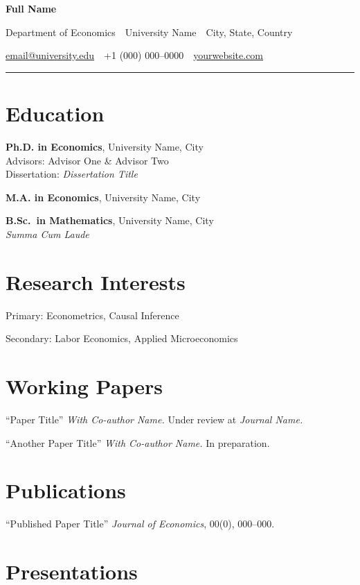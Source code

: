 \documentclass[11pt]{article}
\makeatletter
\newcommand{\cvname}{Full Name}
\newcommand{\cvdepartment}{Department of Economics}
\newcommand{\cvinstitution}{University Name}
\newcommand{\cvaddress}{City, State, Country}
\newcommand{\cvemail}{email@university.edu}
\newcommand{\cvphone}{+1 (000) 000--0000}
\newcommand{\cvwebsite}{yourwebsite.com}
\newlength{\cvdatecol}
\newenvironment{cventries}{%
    \begin{list}{}{%
            \setlength{\leftmargin}{\cvdatecol}%
            \setlength{\labelwidth}{\dimexpr\cvdatecol-0.5em\relax}%
            \setlength{\labelsep}{0.5em}%
            \setlength{\topsep}{2pt}%
            \setlength{\itemsep}{5pt}%
            \setlength{\parsep}{0pt}%
        }%
    }{
\end{list}}
\newcommand{\cventry}[2]{%
\item[\hfill\small\textit{#1}] #2%
}
\newcommand{\makecvheader}{%
    \thispagestyle{firstpage}%
    \begin{center}
        {\LARGE\textbf{\cvname}}\par
        \vspace{5pt}
        {\small\cvdepartment\ \textbullet\ \cvinstitution\ \textbullet\ \cvaddress}\par
        \vspace{3pt}
        {\small\href{mailto:\cvemail}{\cvemail}\ \textbullet\ \cvphone\ \textbullet\ \href{https://\cvwebsite}{\cvwebsite}}\par
    \end{center}
    \vspace{2pt}%
    \rule{\linewidth}{0.6pt}%
    \vspace{2pt}%
}
\makeatother
\begin{document}
\makecvheader{}

\section{Education}

\begin{cventries}
    \cventry{2020--present}{%
        \textbf{Ph.D. in Economics}, University Name, City\\
        Advisors: Advisor One \& Advisor Two\\
        Dissertation: \textit{Dissertation Title}
    }
    \cventry{2018}{%
        \textbf{M.A. in Economics}, University Name, City
    }
    \cventry{2016}{%
        \textbf{B.Sc.\ in Mathematics}, University Name, City\\
        \textit{Summa Cum Laude}
    }
\end{cventries}

\section{Research Interests}

Primary: Econometrics, Causal Inference\par
Secondary: Labor Economics, Applied Microeconomics

\section{Working Papers}

\begin{cventries}
    \cventry{2024}{%
        ``Paper Title'' \textit{With Co-author Name.} Under review at \textit{Journal Name.}
    }
    \cventry{2023}{%
        ``Another Paper Title'' \textit{With Co-author Name.} In preparation.
    }
\end{cventries}

\section{Publications}

\begin{cventries}
    \cventry{2022}{%
        ``Published Paper Title''
        \textit{Journal of Economics}, 00(0), 000--000.
    }
\end{cventries}

\section{Presentations}
\end{document}
